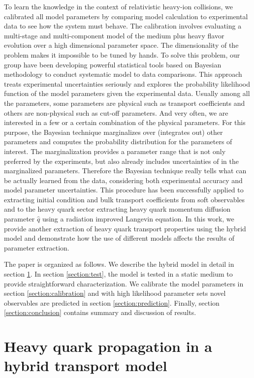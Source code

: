 \documentclass[aps, prc, reprint, amsmath, groupedaddress, nofootinbib]{revtex4-1}
\begin{document}
To learn the knowledge in the context of relativistic heavy-ion collisions, we calibrated all model parameters by comparing model calculation to experimental data to see how the system must behave.
The calibration involves evaluating a multi-stage and multi-component model of the medium plus heavy flavor evolution over a high dimensional parameter space.
The dimensionality of the problem makes it impossible to be tuned by hands.
To solve this problem, our group have been developing powerful statistical tools based on Bayesian methodology to conduct systematic model to data comparisons.
This approach treats experimental uncertainties seriously and explores the probability likelihood function of the model parameters given the experimental data.
Usually among all the parameters, some parameters are physical such as transport coefficients and others are non-physical such as cut-off parameters. 
And very often, we are interested in a few or a certain combination of the physical parameters.
For this purpose, the Bayesian technique marginalizes over (integrates out) other parameters and computes the probability distribution for the parameters of interest. 
The marginalization provides a parameter range that is not only preferred by the experiments, but also already includes uncertainties of in the marginalized parameters.
Therefore the Bayesian technique really tells what can be actually learned from the data, considering both experimental accuracy and model parameter uncertainties.
This procedure has been successfully applied to extracting initial condition and bulk transport coefficients from soft observables and to the heavy quark sector extracting heavy quark momentum diffusion parameter $\hat{q}$ using a radiation improved Langevin equation.
In this work, we provide another extraction of heavy quark transport properties using the hybrid model and demonstrate how the use of different models affects the results of parameter extraction.

The paper is organized as follows. We describe the hybrid model in detail in section \ref{section:model}. In section \ref{section:test}, the model is tested in a static medium to provide straightforward characterization. We calibrate the model parameters in section \ref{section:calibration} and with high likelihood parameter sets novel observables are predicted in section \ref{section:prediction}. Finally, section \ref{section:conclusion} contains summary and discussion of results.

\section{Heavy quark propagation in a hybrid transport model}\label{section:model}
\end{document}
